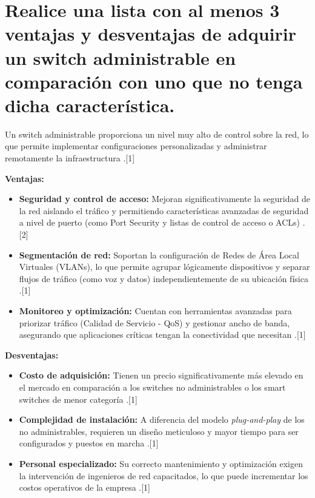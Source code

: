 \documentclass[a4paper,12pt]{article}
\begin{document}
\renewcommand{\footrulewidth}{0.4pt}  %

\setcounter{page}{1}

\tableofcontents

\newpage

\section{Realice una lista con al menos 3 ventajas y desventajas de adquirir un switch administrable en comparación con uno que no tenga dicha característica.}

Un switch administrable proporciona un nivel muy alto de control sobre la red, lo que permite implementar configuraciones personalizadas y administrar remotamente la infraestructura \cite{cisco_business}.[1]

\textbf{Ventajas:}
\begin{itemize}
    \item \textbf{Seguridad y control de acceso:} Mejoran significativamente la seguridad de la red aislando el tráfico y permitiendo características avanzadas de seguridad a nivel de puerto (como Port Security y listas de control de acceso o ACLs) \cite{cisco_business}.[2]
    \item \textbf{Segmentación de red:} Soportan la configuración de Redes de Área Local Virtuales (VLANs), lo que permite agrupar lógicamente dispositivos y separar flujos de tráfico (como voz y datos) independientemente de su ubicación física \cite{cisco_business}.[1]
    \item \textbf{Monitoreo y optimización:} Cuentan con herramientas avanzadas para priorizar tráfico (Calidad de Servicio - QoS) y gestionar ancho de banda, asegurando que aplicaciones críticas tengan la conectividad que necesitan \cite{cisco_business}.[1]
\end{itemize}

\textbf{Desventajas:}
\begin{itemize}
    \item \textbf{Costo de adquisición:} Tienen un precio significativamente más elevado en el mercado en comparación a los switches no administrables o los smart switches de menor categoría \cite{cisco_business}.[1]
    \item \textbf{Complejidad de instalación:} A diferencia del modelo \textit{plug-and-play} de los no administrables, requieren un diseño meticuloso y mayor tiempo para ser configurados y puestos en marcha \cite{cisco_business}.[1]
    \item \textbf{Personal especializado:} Su correcto mantenimiento y optimización exigen la intervención de ingenieros de red capacitados, lo que puede incrementar los costos operativos de la empresa \cite{cisco_business}.[1]
\end{itemize}
\end{document}
